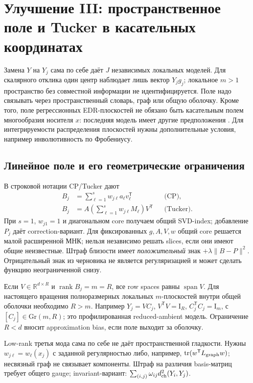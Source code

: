 \documentclass[11pt,a4paper]{article}
\newcommand{\R}{\mathbb R}
\newcommand{\Id}{\mathrm I}
\newcommand{\T}{^{\mathsf T}}
\newcommand{\Gr}{\mathrm{Gr}}
\DeclareMathOperator{\rank}{rank}
\DeclareMathOperator{\tr}{tr}
\DeclareMathOperator{\spanop}{span}
\begin{document}
\section{Улучшение III: пространственное поле и Tucker в касательных координатах}\label{sec:field}

Замена $Y$ на $Y_j$ сама по себе даёт $J$ независимых локальных моделей.
Для скалярного отклика один центр наблюдает лишь вектор $Y_jg_j$;
локальное $m>1$ пространство без совместной информации не идентифицируется.
Поле надо связывать через пространственный словарь, граф или общую оболочку.
Кроме того, поле регрессионных EDR-плоскостей не обязано быть касательным
полем многообразия носителя $x$: последняя модель имеет другие
предположения \cite{manifold}. Для интегрируемости распределения плоскостей
нужны дополнительные условия, например инволютивность по Фробениусу.

\subsection{Линейное поле и его геометрические ограничения}
В строковой нотации CP/Tucker \cite{tucker} дают
\begin{align}
 B_j&=\sum_{\ell=1}^s w_{j\ell}a_\ell v_\ell\T
                                     &&\text{(CP)},\label{eq:cp}\\
 B_j&=A\left(\sum_{\ell=1}^{s}w_{j\ell}M_\ell\right)V\T
                                     &&\text{(Tucker)}.\label{eq:tucker}
\end{align}
При $s=1$, $w_{j1}=1$ и диагональном core получаем общий SVD-index;
добавление $P_j$ даёт correction-вариант.
Для фиксированных $g,A,V,w$ общий core решается малой расширенной МНК;
нельзя независимо решать slices, если они имеют общие неизвестные.
Штраф близости имеет \emph{положительный} знак $+\lambda\|B-P\|^2$.
Отрицательный знак из черновика не является регуляризацией и может
сделать функцию неограниченной снизу.

Если $V\in\R^{d\times R}$ и $\rank B_j=m=R$, все row spaces равны
$\spanop V$. Для настоящего вращения полноразмерных локальных
$m$-плоскостей внутри общей оболочки необходимо $R>m$.
Например $Y_j=VC_j$, $V\T V=\Id_R$, $C_j\T C_j=\Id_m$,
с $[C_j]\in\Gr(m,R)$; это профилированная reduced-ambient модель.
Ограничение $R<d$ вносит approximation bias, если поле выходит за оболочку.

Low-rank третья мода сама по себе не даёт пространственной гладкости.
Нужны $w_{j\ell}=w_\ell(x_j)$ с заданной регулярностью либо,
например, $\tr(w\T L_{\rm graph}w)$; несвязный граф не связывает компоненты.
Штраф на различия basis-матриц требует общего gauge; invariant-вариант:
$\sum_{(i,j)}\omega_{ij}d_{\rm ch}^2(Y_i,Y_j)$.
\end{document}
